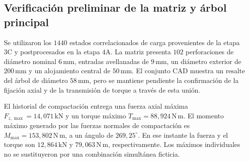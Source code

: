\subsection{Verificación preliminar de la matriz y árbol principal}
Se utilizaron los $1440$ estados correlacionados de carga provenientes de la etapa 3C y postprocesados en la etapa 4A. La matriz presenta $102$ perforaciones de diámetro nominal $6\,\mathrm{mm}$, entradas avellanadas de $9\,\mathrm{mm}$, un diámetro exterior de $200\,\mathrm{mm}$ y un alojamiento central de $50\,\mathrm{mm}$. El conjunto CAD muestra un resalte del árbol de diámetro $58\,\mathrm{mm}$, pero se mantiene pendiente la confirmación de la fijación axial y de la transmisión de torque a través de esta unión.

El historial de compactación entrega una fuerza axial máxima $F_{z,\max}=14{,}071\,\mathrm{kN}$ y un torque máximo $T_{\max}=88{,}924\,\mathrm{N\,m}$. El momento máximo generado por las fuerzas normales de compactación es $M_{\max}=153{,}802\,\mathrm{N\,m}$, a un ángulo de $269{,}25^\circ$. En ese instante la fuerza y el torque son $12{,}864\,\mathrm{kN}$ y $79{,}063\,\mathrm{N\,m}$, respectivamente. Los máximos individuales no se sustituyeron por una combinación simultánea ficticia.

